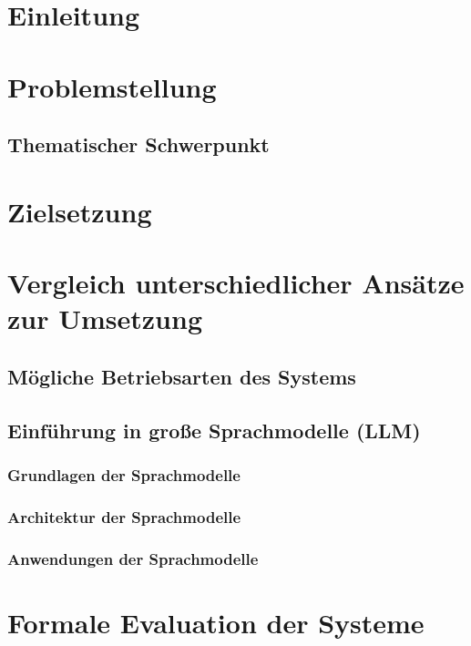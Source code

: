 



\section{Einleitung}

\section{Problemstellung}
    
    \subsection{Thematischer Schwerpunkt}

\section{Zielsetzung}

\section{Vergleich unterschiedlicher Ansätze zur Umsetzung}%

    \subsection{Mögliche Betriebsarten des Systems}

    \subsection{Einführung in große Sprachmodelle (LLM)}

    \subsubsection{Grundlagen der Sprachmodelle}

    \subsubsection{Architektur der Sprachmodelle}

    \subsubsection{Anwendungen der Sprachmodelle}

\section{Formale Evaluation der Systeme}%

